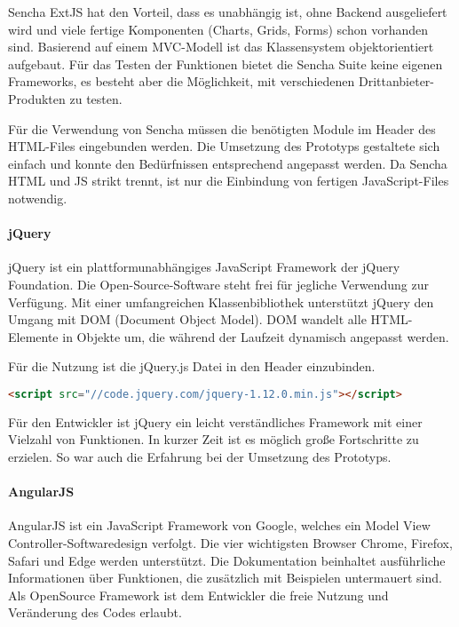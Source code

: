 Sencha ExtJS hat den Vorteil, dass es unabhängig ist, ohne Backend ausgeliefert wird und viele fertige Komponenten (Charts, Grids, Forms) schon vorhanden sind. Basierend auf einem MVC-Modell ist das Klassensystem objektorientiert aufgebaut. Für das Testen der Funktionen bietet die Sencha Suite keine eigenen Frameworks, es besteht aber die Möglichkeit, mit verschiedenen Drittanbieter-Produkten zu testen.\cite{SENCHAFEATURES,SENCHALICENSE}


Für die Verwendung von Sencha müssen die benötigten Module im Header des HTML-Files eingebunden werden. Die Umsetzung des Prototyps gestaltete sich einfach und konnte den Bedürfnissen entsprechend angepasst werden. Da Sencha HTML und JS strikt trennt, ist nur die Einbindung von fertigen JavaScript-Files notwendig.

\paragraph{jQuery}
jQuery ist ein plattformunabhängiges JavaScript Framework der jQuery Foundation. Die Open-Source-Software steht frei für jegliche Verwendung zur Verfügung. Mit einer umfangreichen Klassenbibliothek unterstützt jQuery den Umgang mit DOM (Document Object Model). DOM wandelt alle HTML-Elemente in Objekte um, die während der Laufzeit dynamisch angepasst werden.\cite{JQUERY} 

Für die Nutzung ist die jQuery.js Datei in den Header einzubinden.
\begin{lstlisting}[caption={jQuery einbinden\cite{JQUERYDOWN}}, language=HTML]
<script src="//code.jquery.com/jquery-1.12.0.min.js"></script>
\end{lstlisting}

Für den Entwickler ist jQuery ein leicht verständliches Framework mit einer Vielzahl von Funktionen. In kurzer Zeit ist es möglich große Fortschritte zu erzielen. So war auch die Erfahrung bei der Umsetzung des Prototyps. \cite{JQUERYTOOL}

\paragraph{AngularJS}
AngularJS ist ein JavaScript Framework von Google, welches ein Model View Controller-Softwaredesign verfolgt. Die vier wichtigsten Browser Chrome, Firefox, Safari und Edge werden unterstützt. Die Dokumentation beinhaltet ausführliche Informationen über Funktionen, die zusätzlich mit Beispielen untermauert sind. 
Als OpenSource Framework ist dem Entwickler die freie Nutzung und Veränderung des Codes erlaubt.

